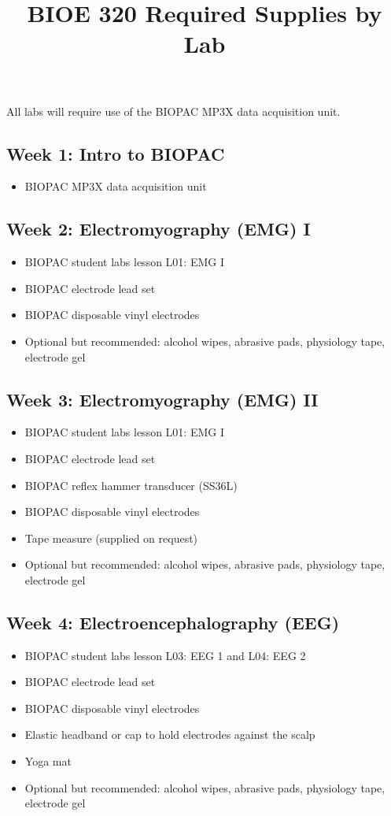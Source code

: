 \documentclass{article}
\title{BIOE 320 Required Supplies by Lab}
\author{ }
\date{}
\begin{document}
\maketitle
\begin{info}
All labs will require use of the BIOPAC MP3X data acquisition unit.
\end{info}


\subsection*{Week 1: Intro to BIOPAC}
\begin{itemize}
	\item BIOPAC MP3X data acquisition unit
\end{itemize}

\subsection*{Week 2: Electromyography (EMG) I}
\begin{itemize}
	\item BIOPAC student labs lesson L01: EMG I
	\item BIOPAC electrode lead set
	\item BIOPAC disposable vinyl electrodes
	\item Optional but recommended: alcohol wipes, abrasive pads, physiology tape, electrode gel
\end{itemize}

\subsection*{Week 3: Electromyography (EMG) II}
\begin{itemize}
	\item BIOPAC student labs lesson L01: EMG I
	\item BIOPAC electrode lead set
	\item BIOPAC reflex hammer transducer (SS36L)
	\item BIOPAC disposable vinyl electrodes
	\item Tape measure (supplied on request)
	\item Optional but recommended: alcohol wipes, abrasive pads, physiology tape, electrode gel
\end{itemize}

\subsection*{Week 4: Electroencephalography (EEG)}
\begin{itemize}
	\item BIOPAC student labs lesson L03: EEG 1 and L04: EEG 2
	\item BIOPAC electrode lead set
	\item BIOPAC disposable vinyl electrodes
	\item Elastic headband or cap to hold electrodes against the scalp
	\item Yoga mat
	\item Optional but recommended: alcohol wipes, abrasive pads, physiology tape, electrode gel
\end{itemize}
\end{document}
